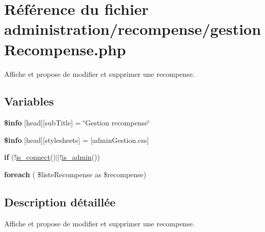 \hypertarget{gestionRecompense_8php}{}\section{Référence du fichier administration/recompense/gestion\+Recompense.php}
\label{gestionRecompense_8php}


Affiche et propose de modifier et supprimer une recompense.  


\subsection*{Variables}
\begin{DoxyCompactItemize}
\item 
\mbox{\label{gestionRecompense_8php_a024f87f9bf4f3b33710e2e7ff8f60823}} 
{\bfseries \$info} \mbox{[}\textquotesingle{}head\textquotesingle{}\mbox{]}\mbox{[}\textquotesingle{}sub\+Title\textquotesingle{}\mbox{]} = \char`\"{}Gestion recompense\char`\"{}
\item 
\mbox{\label{gestionRecompense_8php_af6044c8bf78ebc8c58057e14d7738bbd}} 
{\bfseries \$info} \mbox{[}\textquotesingle{}head\textquotesingle{}\mbox{]}\mbox{[}\textquotesingle{}stylesheets\textquotesingle{}\mbox{]} = \mbox{[}\textquotesingle{}admin\+Gestion.\+css\textquotesingle{}\mbox{]}
\item 
\mbox{\label{gestionRecompense_8php_af06578d46576ae68ff2e0780832fd8a0}} 
{\bfseries if} (!\hyperlink{fonctionCompte_8php_a2fe594e0482307b8729ea37780d6f74b}{is\+\_\+connect}()$\vert$$\vert$!\hyperlink{fonctionCompte_8php_a0b327581800dba50ad70720e23ae2ed2}{is\+\_\+admin}())
\item 
\mbox{\label{gestionRecompense_8php_a6b56e4194c09a92f06cf0fc1ec83271b}} 
{\bfseries foreach} ( \$liste\+Recompense as \$recompense)
\end{DoxyCompactItemize}


\subsection{Description détaillée}
Affiche et propose de modifier et supprimer une recompense. 


